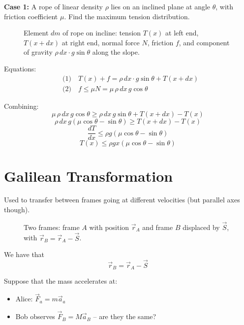 \begin{example}

\textbf{Case 1:} A rope of linear density $\rho$ lies on an inclined plane at angle $\theta$, with friction coefficient $\mu$. Find the maximum tension distribution.

\begin{figure}[H]
  \centering
  \caption{Element $dm$ of rope on incline: tension $T(x)$ at left end, $T(x+dx)$ at right end, normal force $N$, friction $f$, and component of gravity $\rho\,dx\cdot g\sin\theta$ along the slope.}
\end{figure}

Equations:
\begin{align*}
  &\text{(1)}\quad T(x) + f = \rho\,dx\cdot g\sin\theta + T(x+dx) \\
  &\text{(2)}\quad f \leq \mu N = \mu\,\rho\,dx\,g\cos\theta
\end{align*}

Combining:
\[
  \mu\,\rho\,dx\,g\cos\theta \geq \rho\,dx\,g\sin\theta + T(x+dx) - T(x)
\]
\[
  \rho\,dx\,g(\mu\cos\theta - \sin\theta) \geq T(x+dx) - T(x)
\]
\[
  \frac{dT}{dx} \leq \rho g(\mu\cos\theta - \sin\theta)
\]
\[
  T(x) \leq \rho g x(\mu\cos\theta - \sin\theta)
\]
\end{example}

\section{Galilean Transformation}

Used to transfer between frames going at different velocities (but parallel axes though).

\begin{figure}[H]
  \centering
  \caption{Two frames: frame $A$ with position $\vec{r}_A$ and frame $B$ displaced by $\vec{S}$, with $\vec{r}_B = \vec{r}_A - \vec{S}$.}
\end{figure}

We have that
\begin{equation}
  \vec{r}_B = \vec{r}_A - \vec{S} \tag{1}
\end{equation}

Suppose that the mass accelerates at:
\begin{itemize}
  \item Alice: $\vec{F}_a = m\vec{a}_a$
  \item Bob observes $\vec{F}_B = M\vec{a}_B$ \quad -- are they the same?
\end{itemize}

